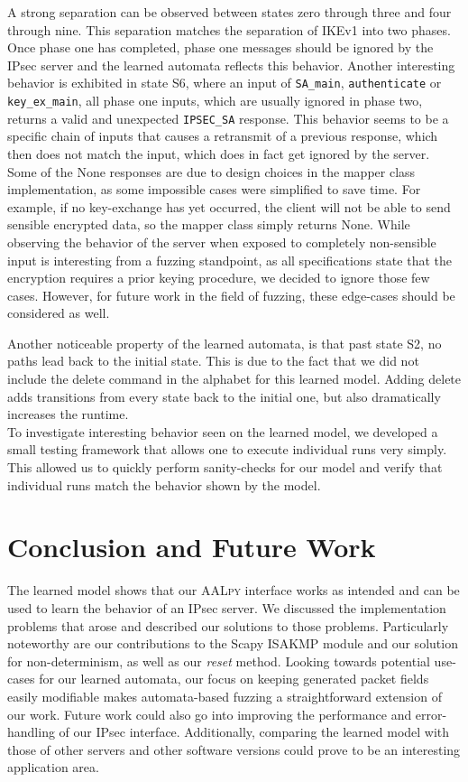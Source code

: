 \documentclass[runningheads]{llncs}
\begin{document}
A strong separation can be observed between states zero through three and four through nine. This separation matches the separation of IKEv1 into two phases. Once phase one has completed, phase one messages should be ignored by the IPsec server and the learned automata reflects this behavior. Another interesting behavior is exhibited in state S6, where an input of \texttt{SA\_main}, \texttt{authenticate} or \texttt{key\_ex\_main}, all phase one inputs, which are usually ignored in phase two, returns a valid and unexpected \texttt{IPSEC\_SA} response. This behavior seems to be a specific chain of inputs that causes a retransmit of a previous response, which then does not match the input, which does in fact get ignored by the server. Some of the None responses are due to design choices in the mapper class implementation, as some impossible cases were simplified to save time. For example, if no key-exchange has yet occurred, the client will not be able to send sensible encrypted data, so the mapper class simply returns None. While observing the behavior of the server when exposed to completely non-sensible input is interesting from a fuzzing standpoint, as all specifications state that the encryption requires a prior keying procedure, we decided to ignore those few cases. However, for future work in the field of fuzzing, these edge-cases should be considered as well.

Another noticeable property of the learned automata, is that past state S2, no paths lead back to the initial state. This is due to the fact that we did not include the delete command in the alphabet for this learned model. Adding delete adds transitions from every state back to the initial one, but also dramatically increases the runtime. \\

To investigate interesting behavior seen on the learned model, we developed a small testing framework that allows one to execute individual runs very simply. This allowed us to quickly perform sanity-checks for our model and verify that individual runs match the behavior shown by the model.


\section{Conclusion and Future Work} \label{chap:6} %
The learned model shows that our \textsc{AALpy} interface works as intended and can be used to learn the behavior of an IPsec server. We discussed the implementation problems that arose and described our solutions to those problems. Particularly noteworthy are our contributions to the Scapy ISAKMP module and our solution for non-determinism, as well as our \emph{reset} method. Looking towards potential use-cases for our learned automata, our focus on keeping generated packet fields easily modifiable makes automata-based fuzzing a straightforward extension of our work. Future work could also go into improving the performance and error-handling of our IPsec interface. Additionally, comparing the learned model with those of other servers and other software versions could prove to be an interesting application area. \pagebreak


%
%
%


\end{document}
